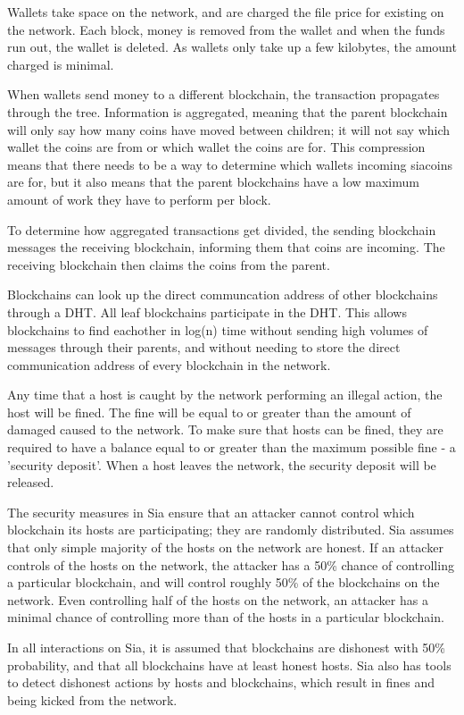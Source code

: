 \documentclass[twocolumn]{article}
\begin{document}
Wallets take space on the network, and are charged the file price for existing on the network.
Each block, money is removed from the wallet and when the funds run out, the wallet is deleted.
As wallets only take up a few kilobytes, the amount charged is minimal.

When wallets send money to a different blockchain, the transaction propagates through the tree.
Information is aggregated, meaning that the parent blockchain will only say how many coins have moved between children; it will not say which wallet the coins are from or which wallet the coins are for.
This compression means that there needs to be a way to determine which wallets incoming siacoins are for, but it also means that the parent blockchains have a low maximum amount of work they have to perform per block.

To determine how aggregated transactions get divided, the sending blockchain messages the receiving blockchain, informing them that coins are incoming.
The receiving blockchain then claims the coins from the parent.

Blockchains can look up the direct communcation address of other blockchains through a DHT.
All leaf blockchains participate in the DHT.
This allows blockchains to find eachother in log(n) time without sending high volumes of messages through their parents, and without needing to store the direct communication address of every blockchain in the network.

Any time that a host is caught by the network performing an illegal action, the host will be fined.
The fine will be equal to or greater than the amount of damaged caused to the network.
To make sure that hosts can be fined, they are required to have a balance equal to or greater than the maximum possible fine - a 'security deposit'.
When a host leaves the network, the security deposit will be released.

The security measures in Sia ensure that an attacker cannot control which blockchain its hosts are participating; they are randomly distributed.
Sia assumes that only simple majority of the hosts on the network are honest.
If an attacker controls \fortynine{} of the hosts on the network, the attacker has a 50\% chance of controlling a particular blockchain, and will control roughly 50\% of the blockchains on the network.
Even controlling half of the hosts on the network, an attacker has a minimal chance of controlling more than \maxcorruption{} of the hosts in a particular blockchain.

In all interactions on Sia, it is assumed that blockchains are dishonest with 50\% probability, and that all blockchains have at least \inversemaxcorruption{} honest hosts.
Sia also has tools to detect dishonest actions by hosts and blockchains, which result in fines and being kicked from the network.
\end{document}
